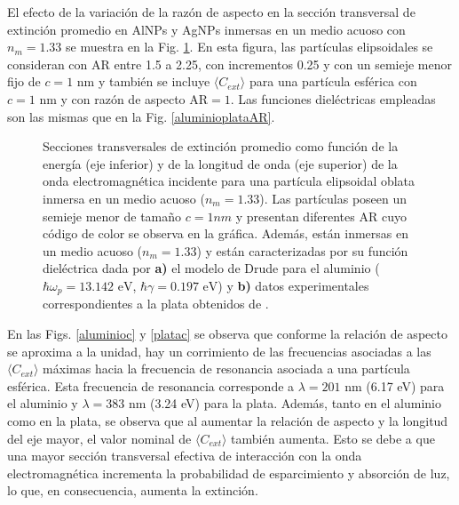 El efecto de la variación de la razón de aspecto en la sección transversal de extinción promedio en AlNPs y AgNPs inmersas en un medio acuoso con $n_m=1.33$ se muestra en la Fig. \ref{aluminioplatac}. En esta figura, las partículas elipsoidales se consideran con AR entre 1.5 a 2.25, con incrementos 0.25 y con un semieje menor fijo de $c=1\text{ nm}$ y también se incluye $\langle C_{ext}\rangle$ para una partícula esférica con  $c=1\text{ nm}$ y con razón de aspecto AR$=1$. Las funciones dieléctricas empleadas son las mismas que en la Fig. \ref{aluminioplataAR}.


\begin{figure}[h!]
	\quad%
	\caption{Secciones transversales de extinción promedio como función de la energía (eje inferior) y de la longitud de onda (eje superior) de la onda electromagnética incidente para una partícula elipsoidal oblata inmersa en un medio acuoso ($n_m=1.33$). Las partículas  poseen un semieje menor de tamaño $c=1nm$ y presentan diferentes AR cuyo código de color se observa en la gráfica. Además, están inmersas en un medio acuoso ($n_m=1.33$) y están caracterizadas por su función dieléctrica dada por  \textbf{a)} el modelo de Drude para el aluminio ($\hbar\omega_p=13.142\text{ eV}$, $\hbar\gamma=0.197\text{ eV}$) y \textbf{b)} datos experimentales correspondientes a la plata obtenidos de \cite{Plata}.}\label{aluminioplatac}
\end{figure} 

 En las Figs. \ref{aluminioc}  y \ref{platac} se observa que conforme la relación de aspecto se aproxima a la unidad, hay un corrimiento de las frecuencias asociadas a las $\langle C_{ext}\rangle$ máximas hacia la frecuencia de resonancia asociada a una partícula esférica. Esta frecuencia de resonancia corresponde a $\lambda=201\text{ nm}$ (6.17 eV) para el aluminio y $\lambda=383\text{ nm}$ (3.24 eV) para la plata. Además, tanto en el aluminio como en la plata, se observa que al aumentar la relación de aspecto y la longitud del eje mayor, el valor nominal de  $\langle C_{ext}\rangle$ también aumenta. Esto se debe a que una mayor sección transversal efectiva de interacción con la onda electromagnética incrementa la probabilidad de esparcimiento y absorción de luz, lo que, en consecuencia, aumenta la extinción.



